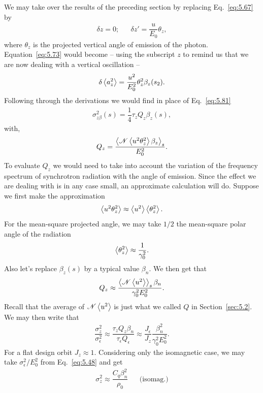 We may take over the results of the preceding section by replacing Eq.~\eqref{eq:5.67} by
\begin{align}
	\delta z = 0; && \delta z' = \dfrac{u}{E_0} \theta_z,
\end{align}
where $\theta_z$ is the projected vertical angle of emission of the photon. Equation~\eqref{eq:5.73} would become -- using the subscript $z$ to remind us that we are now dealing with a vertical oscillation --
\begin{align}
	\delta\left< a_z^2 \right> = \dfrac{u^2}{E_0^2} \theta_z^2 \beta_z (s_2).
\end{align}
Following through the derivations we would find in place of Eq.~\eqref{eq:5.81}
\begin{align}
	\sigma_{z\beta}^2(s) = \dfrac{1}{4} \tau_z Q_z \beta_z(s),
\end{align}
with,
\begin{align}
	Q_z = \dfrac{\left< \mathscr{N}\left< u^2 \theta_z^2 \right>\beta_z \right>_s}{E_0^2}.
\end{align}
To evaluate $Q_z$ we would need to take into account the variation of the frequency spectrum of synchrotron radiation with the angle of emission. Since the effect we are dealing with is in any case small, an approximate calculation will do. Suppose we first make the approximation
\begin{align}
	\left< u^2 \theta_z^2 \right> \approx \left< u^2 \right>\left< \theta_z^2 \right>.
\end{align}
For the mean-square projected angle, we may take $1/2$ the mean-square polar angle of the radiation
\begin{align}
	\left< \theta_z^2 \right> \approx \dfrac{1}{\gamma_0^2}.
\end{align}
Also let's replace $\beta_z(s)$ by a typical value $\beta_n$. We then get that
\begin{align}
	Q_z \approx \dfrac{\left< \mathscr{N}\left< u^2 \right> \right>_s\beta_n}{\gamma_0^2 E_0^2}.
\end{align}
Recall that the average of $\mathscr{N}\left< u^2 \right>$ is just what we called $Q$ in Section~\ref{sec:5.2}. We may then write that
\begin{align}
	\dfrac{\sigma_z^2}{\sigma_\epsilon^2} \approx \dfrac{\tau_z Q_z \beta_n}{\tau_\epsilon Q_\epsilon} \approx \dfrac{J_\epsilon}{J_z} \dfrac{\beta_n^2}{\gamma_0^2 E_0^2}.
\end{align}
For a flat design orbit $J_z \approx 1$. Considering only the isomagnetic case, we may take $\sigma_\epsilon^2/E_0^2$ from Eq.~\eqref{eq:5.48} and get
\begin{align} \label{eq:5.107}
	\sigma_z^2 \approx \dfrac{C_q \beta_n^2}{\rho_0} && \text{(isomag.)}
\end{align}
